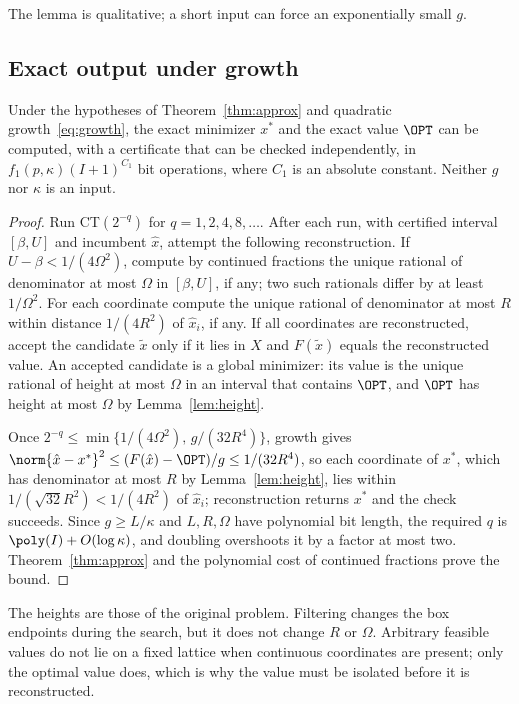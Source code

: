 The lemma is qualitative; a short input can force an exponentially small
$g$.

\subsection{Exact output under growth}

\begin{theorem}\label{thm:exact}
Under the hypotheses of Theorem~\ref{thm:approx} and quadratic
growth~\eqref{eq:growth}, the exact minimizer $x^*$ and the exact value
$\OPT$ can be computed, with a certificate that can be checked
independently, in $f_1(p,\kappa)(I+1)^{C_1}$ bit operations, where $C_1$ is
an absolute constant. Neither $g$ nor $\kappa$ is an input.
\end{theorem}

\begin{proof}
Run CT$(2^{-q})$ for $q=1,2,4,8,\dots$. After each run, with certified
interval $[\beta,U]$ and incumbent $\hat x$, attempt the following
reconstruction. If $U-\beta<1/(4\Omega^2)$, compute by continued fractions the
unique rational of denominator at most $\Omega$ in $[\beta,U]$, if any; two such
rationals differ by at least $1/\Omega^2$. For each coordinate compute the unique
rational of denominator at most $R$ within distance $1/(4R^2)$ of
$\hat x_i$, if any. If all coordinates are reconstructed, accept the
candidate $\tilde x$ only if it lies in $X$ and $F(\tilde x)$ equals the
reconstructed value. An accepted candidate is a global minimizer: its value
is the unique rational of height at most $\Omega$ in an interval that contains
$\OPT$, and $\OPT$ has height at most $\Omega$ by Lemma~\ref{lem:height}.

Once $2^{-q}\le\min\{1/(4\Omega^2),\,g/(32R^4)\}$, growth gives
$\norm{\hat x-x^*}^2\le(F(\hat x)-\OPT)/g\le1/(32R^4)$, so each coordinate
of $x^*$, which has denominator at most $R$ by Lemma~\ref{lem:height}, lies
within $1/(\sqrt{32}R^2)<1/(4R^2)$ of $\hat x_i$; reconstruction returns
$x^*$ and the check succeeds. Since $g\ge L/\kappa$ and $L,R,\Omega$ have
polynomial bit length, the required $q$ is $\poly(I)+O(\log\kappa)$, and
doubling overshoots it by a factor at most two. Theorem~\ref{thm:approx}
and the polynomial cost of continued fractions prove the bound.
\end{proof}

The heights are those of the original problem. Filtering changes the box
endpoints during the search, but it does not change $R$ or $\Omega$.
Arbitrary feasible values do not lie on a fixed lattice when continuous
coordinates are present; only the optimal value does, which is why the
value must be isolated before it is reconstructed.

